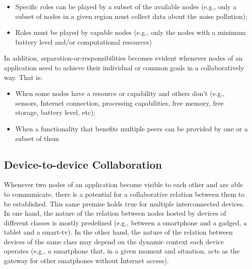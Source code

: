 \begin{itemize}
	\item Specific roles can be played by a subset of the available nodes (e.g., only a subset of nodes in a given region must collect data about the noise pollution);
	
	\item Roles must be played by capable nodes (e.g., only the nodes with a minimum battery level and/or computational resources)
\end{itemize}


In addition, separation-or-responsibilities becomes evident whenever nodes of an application need to achieve their individual or common goals in a collaboratively way. That is:

\begin{itemize}
	
	\item When some nodes have a resource or capability and others don't (e.g., sensors, Internet connection, processing capabilities, free memory, free storage, battery level, etc);
	
	\item When a functionality that benefits multiple peers can be provided by one or a subset of them
	
\end{itemize}

\subsection{Device-to-device Collaboration}

Whenever two nodes of an application become visible to each other and are able to communicate, there is a potential for a collaborative relation between them to be established. 
This same premise holds true for multiple interconnected devices. 
In one hand, the nature of the relation between nodes hosted by devices of different classes is mostly predefined (e.g., between a smartphone and a gadged, a tablet and a smart-tv). In the other hand, the nature of the relation between devices of the same class may depend on the dynamic context each device operates (e.g., a smartphone that, in a given moment and situation, acts as the gateway for other smatphones without Internet access). 

